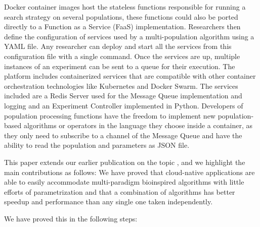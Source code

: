 \documentclass[review]{elsarticle}
\begin{document}
Docker container images host the stateless functions responsible for running 
a search strategy on several populations, these functions could also be ported
directly to a Function as a Service (FaaS) \cite{Roberts2016} implementation.
Researchers then define the configuration of services used by
a multi-population algorithm using a YAML file. Any researcher can deploy and
start all the services from this configuration file with a single command. Once
the services are up, multiple instances of an experiment can be sent to a queue
for their execution. The platform includes containerized services that are
compatible with other container orchestration technologies like Kubernetes and
Docker Swarm. The services included are a Redis Server used for the Message
Queue implementation and logging and an Experiment Controller implemented in
Python. Developers of population processing functions have the freedom to
implement new population-based algorithms or operators in the language they
choose inside a container, as they only need to subscribe to a channel of the
Message Queue and have the ability to read the population and parameters as JSON  
file.

This paper extends our earlier publication on the topic
\cite{guervos2018introducing}, and we highlight the main contributions as
follows:
We have proved that cloud-native applications are
able to easily accommodate multi-paradigm bioinspired algorithms
with little efforts of parametrization and
that a combination of algorithms has better speedup and performance
than any single one taken independently.

We have proved this in the following steps:
\end{document}
